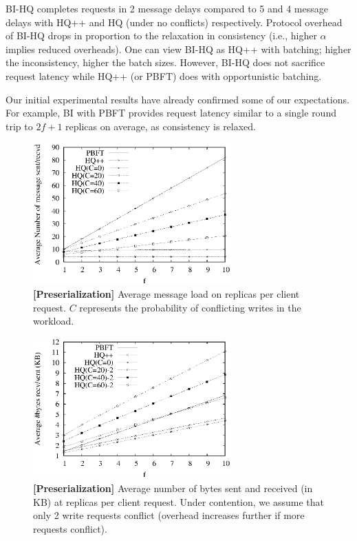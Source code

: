 \documentclass[twocolumn,10pt]{article}
\begin{document}
 BI-HQ completes requests in 2 message delays compared to 5 and 4
message delays with HQ++ and HQ (under no conflicts) respectively. 
Protocol overhead of BI-HQ drops in proportion to the relaxation in consistency 
(i.e., higher $\alpha$  implies reduced overheads). One can view BI-HQ as HQ++ with batching; higher
the inconsistency, higher the batch sizes. However, BI-HQ does not sacrifice request latency while 
HQ++ (or PBFT) does with opportunistic batching.

Our initial experimental results have already confirmed
some of our expectations. For example, BI with PBFT provides request latency similar to a single round 
trip to $2f+1$ replicas on average,  as consistency is relaxed. 
\begin{figure}
\centering
\includegraphics[width=3in]{Figures/Abs_Mesg_Count_Comp_PBFT_HQ.ps}
\caption{\textbf{[Preserialization]} Average message load on replicas per client
request. $C$ represents the probability of conflicting writes in the workload.
}
\label{fig:abs_mesg_count_comp} \end{figure}

\begin{figure}
\centering
\includegraphics[width=3in]{Figures/Byte_Count_Comp.ps}
\caption{\textbf{[Preserialization]} Average number of bytes sent and received (in KB) at replicas
per client request. Under contention, we assume
that only 2 write requests conflict (overhead increases further if more requests conflict).
}
\label{fig:byte_count_comp}
\end{figure}
\end{document}
